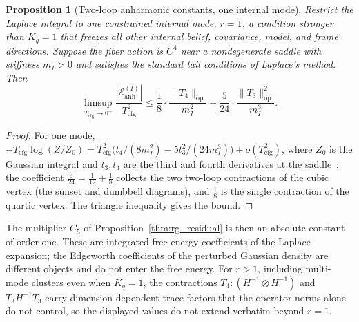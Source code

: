 \documentclass[11pt]{article}
\newtheorem{proposition}{Proposition}
\begin{document}
\begin{proposition}[Two-loop anharmonic constants, one internal mode]
\label{thm:rg_residual_explicit}
Restrict the Laplace integral to one constrained internal mode, $r=1$, a condition stronger than $K_q=1$ that freezes all other internal belief, covariance, model, and frame directions. Suppose the fiber action is $C^4$ near a nondegenerate saddle with stiffness $m_I>0$ and satisfies the standard tail conditions of Laplace's method. Then
\begin{equation}
\limsup_{T_{\mathrm{cfg}}\to0^+}\frac{|\mathcal{E}_{\mathrm{anh}}^{(I)}|}{T_{\mathrm{cfg}}^2} \leq \frac{1}{8} \cdot \frac{\|T_4\|_{\mathrm{op}}}{m_I^2} + \frac{5}{24} \cdot \frac{\|T_3\|_{\mathrm{op}}^2}{m_I^3}.
\label{eq:rg_C5_explicit}
\end{equation}
\end{proposition}

\begin{proof}
For one mode, $-T_{\mathrm{cfg}}\log(Z/Z_0)=T_{\mathrm{cfg}}^2\big(t_4/(8m_I^2)-5t_3^2/(24m_I^3)\big)+o(T_{\mathrm{cfg}}^2)$, where $Z_0$ is the Gaussian integral and $t_3,t_4$ are the third and fourth derivatives at the saddle~\cite{BenderOrszag1999, wong2001asymptotic}; the coefficient $\tfrac{5}{24}=\tfrac{1}{12}+\tfrac{1}{8}$ collects the two two-loop contractions of the cubic vertex (the sunset and dumbbell diagrams), and $\tfrac18$ is the single contraction of the quartic vertex. The triangle inequality gives the bound.
\end{proof}

The multiplier $C_5$ of Proposition~\ref{thm:rg_residual} is then an absolute constant of order one. These are integrated free-energy coefficients of the Laplace expansion; the Edgeworth coefficients of the perturbed Gaussian density are different objects and do not enter the free energy. For $r>1$, including multi-mode clusters even when $K_q=1$, the contractions $T_4 \mathbin{:} (H^{-1} \otimes H^{-1})$ and $T_3 H^{-1} T_3$ carry dimension-dependent trace factors that the operator norms alone do not control, so the displayed values do not extend verbatim beyond $r=1$.
\end{document}
